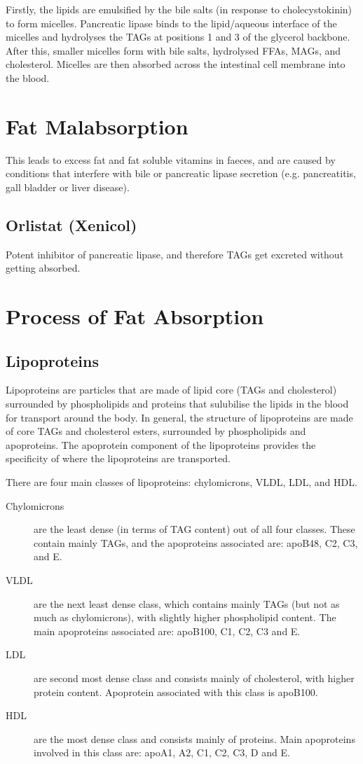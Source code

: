 \documentclass[a4paper, 12pt]{report}
\begin{document}
Firstly, the lipids are emulsified by the bile salts (in response to cholecystokinin) to form micelles.
Pancreatic lipase binds to the lipid/aqueous interface of the micelles and hydrolyses the TAGs at positions 1 and 3 of the glycerol backbone.
After this, smaller micelles form with bile salts, hydrolysed FFAs, MAGs, and cholesterol.
Micelles are then absorbed across the intestinal cell membrane into the blood.

\section{Fat Malabsorption}

This leads to excess fat and fat soluble vitamins in faeces, and are caused by conditions that interfere with bile or pancreatic lipase secretion (e.g. pancreatitis, gall bladder or liver disease).

\subsection{Orlistat (Xenicol)}

Potent inhibitor of pancreatic lipase, and therefore TAGs get excreted without getting absorbed.

\section{Process of Fat Absorption}

\subsection{Lipoproteins}

Lipoproteins are particles that are made of lipid core (TAGs and cholesterol) surrounded by phospholipids and proteins that sulubilise the lipids in the blood for transport around the body.
In general, the structure of lipoproteins are made of core TAGs and cholesterol esters, surrounded by phospholipids and apoproteins.
The apoprotein component of the lipoproteins provides the specificity of where the lipoproteins are transported.

There are four main classes of lipoproteins: chylomicrons, VLDL, LDL, and HDL.
\begin{description}
\item[Chylomicrons] are the least dense (in terms of TAG content) out of all four classes. These contain mainly TAGs, and the apoproteins associated are: apoB48, C2, C3, and E.
\item[VLDL] are the next least dense class, which contains mainly TAGs (but not as much as chylomicrons), with slightly higher phospholipid content. The main apoproteins associated are: apoB100, C1, C2, C3 and E.
\item[LDL] are second most dense class and consists mainly of cholesterol, with higher protein content. Apoprotein associated with this class is apoB100.
\item[HDL] are the most dense class and consists mainly of proteins. Main apoproteins involved in this class are: apoA1, A2, C1, C2, C3, D and E.
\end{description}
\end{document}
